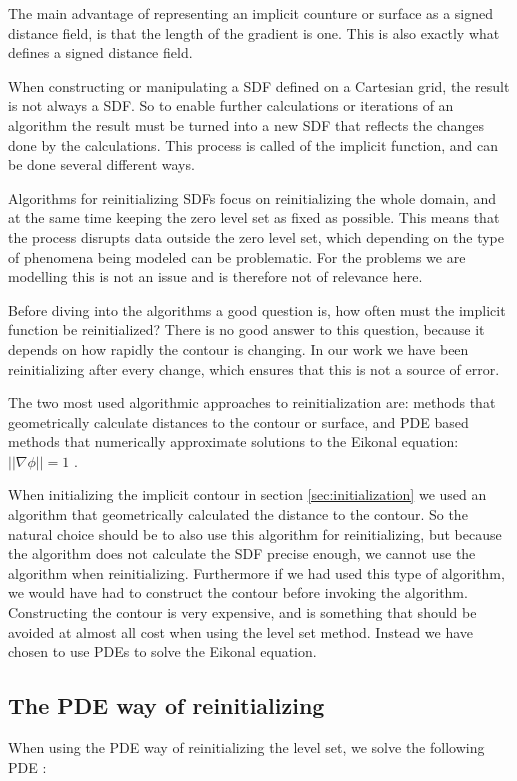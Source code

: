
The main advantage of representing an implicit counture or surface as
a signed distance field, is that the length of the gradient is
one. This is also exactly what defines a signed distance field.

When constructing or manipulating a SDF defined on a Cartesian grid,
the result is not always a SDF. So to enable further calculations or
iterations of an algorithm the result must be turned into a new SDF
that reflects the changes done by the calculations. This process is
called  of the implicit function, and can be
done several different ways.

Algorithms for reinitializing SDFs focus on reinitializing the whole
domain, and at the same time keeping the zero level set as fixed as
possible. This means that the process disrupts data outside the zero
level set, which depending on the type of phenomena being modeled
can be problematic. For the problems we are modelling this is not an
issue and is therefore not of relevance here.

Before diving into the algorithms a good question is, how often must the
implicit function be reinitialized? There is no good answer to this
question, because it depends on how rapidly the contour is
changing. In our work we have been reinitializing after every change,
which ensures that this is not a source of error.

The two most used algorithmic approaches to reinitialization are:
methods that geometrically calculate distances to the contour or surface,
and PDE based methods that numerically approximate solutions to the
Eikonal equation: $||\nabla \phi|| = 1$
.

When initializing the implicit contour in section \vref{sec:initialization}
we used an algorithm that geometrically calculated the distance to the
contour. So the natural choice should be to also use this algorithm for
reinitializing, but because the algorithm does not calculate the
SDF precise enough, we cannot use the algorithm
when reinitializing. Furthermore if we had used this type of
algorithm, we would have had to construct the contour before
invoking the algorithm. Constructing the contour is very expensive,
and is something that should be avoided at almost all cost when using
the level set method. Instead we have chosen to use PDEs to solve the
Eikonal equation.

\subsection{The PDE way of reinitializing}
When using the PDE way of reinitializing the level set, we solve the
following PDE :

